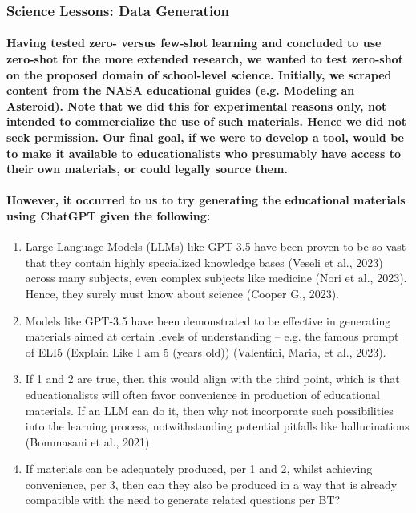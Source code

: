 \documentclass{article}
\begin{document}
\newpage

\subsubsection*{Science Lessons: Data Generation}

\paragraph{Having tested zero- versus few-shot learning and concluded to use zero-shot for the more extended research, we wanted to test zero-shot on the proposed domain of school-level science. Initially, we scraped content from the NASA educational guides (e.g. Modeling an Asteroid). Note that we did this for experimental reasons only, not intended to commercialize the use of such materials. Hence we did not seek permission. Our final goal, if we were to develop a tool, would be to make it available to educationalists who presumably have access to their own materials, or could legally source them.}

\paragraph{However, it occurred to us to try generating the educational materials using ChatGPT given the following:}

\begin{enumerate}
    \item Large Language Models (LLMs) like GPT-3.5 have been proven to be so vast that they contain highly specialized knowledge bases (Veseli et al., 2023) across many subjects, even complex subjects like medicine (Nori et al., 2023). Hence, they surely must know about science (Cooper G., 2023).
    \item Models like GPT-3.5 have been demonstrated to be effective in generating materials aimed at certain levels of understanding – e.g. the famous prompt of ELI5 (Explain Like I am 5 (years old)) (Valentini, Maria, et al., 2023).
    \item If 1 and 2 are true, then this would align with the third point, which is that educationalists will often favor convenience in production of educational materials. If an LLM can do it, then why not incorporate such possibilities into the learning process, notwithstanding potential pitfalls like hallucinations (Bommasani et al., 2021).
    \item If materials can be adequately produced, per 1 and 2, whilst achieving convenience, per 3, then can they also be produced in a way that is already compatible with the need to generate related questions per BT?
\end{enumerate}
\end{document}
